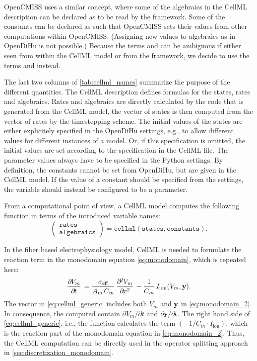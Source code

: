 OpenCMISS uses a similar concept, where some of the algebraics in the CellML description can be declared as  to be read by the framework. Some of the constants can be declared as  such that OpenCMISS sets their values from other computations within OpenCMISS. (Assigning new values to algebraics as in OpenDiHu is not possible.) Because the terms  and  can be ambiguous if either seen from within the CellML model or from the framework, we decide to use the terms  and  instead.

The last two columns of \cref{tab:cellml_names} summarize the purpose of the different quantities. The CellML description defines formulas for the states, rates and algebraics. Rates and algebraics are directly calculated by the code that is generated from the CellML model, the vector of states is then computed from the vector of rates by the timestepping scheme. The initial values of the states are either explicitely specified in the OpenDiHu settings, e.g., to allow different values for different instances of a model. Or, if this specification is omitted,  the initial values are set according to the specification in the CellML file. The parameter values always have to be specified in the Python settings. By definition, the constants cannot be set from OpenDiHu, but are given in the CellML model. If the value of a constant should be specified from the settings, the variable should instead be configured to be a parameter.

From a computational point of view, a CellML model computes the following function in terms of the introduced variable names:
\begin{equation}
  \left(
    \begin{array}{cc}
      \texttt{rates} \\ \texttt{algebraics} 
    \end{array}
  \right) = \texttt{cellml}\left(\texttt{states}, \texttt{constants}\right).
  \label{eq:cellml_generic}
\end{equation}

In the fiber based electrophysiology model, CellML is needed to formulate the reaction term in the monodomain equation \cref{eq:monodomain}, which is repeated here:
\begin{align}\label{eq:monodomain_2}
  \p{V_m}{t}  = \dfrac{\sigma_\text{eff}}{A_m\,C_m} \p{V_m}{x}{2} - \dfrac{1}{C_m} I_\text{ion}(V_m,\bfy).
\end{align}
The  vector in \cref{eq:cellml_generic} includes both $V_m$ and $\textbf{y}$ in \cref{eq:monodomain_2}. In consequence, the computed  contain $\partial V_m/\partial t$ and $\partial\bfy/\partial t$. The right hand side of \cref{eq:cellml_generic}, i.e., the  function calculates the term $(-1/C_m \cdot I_\text{ion})$, which is the reaction part of the monodomain equation in \cref{eq:monodomain_2}. Thus, the CellML computation can be directly used in the operator splitting approach in \cref{sec:discretization_monodomain}.

